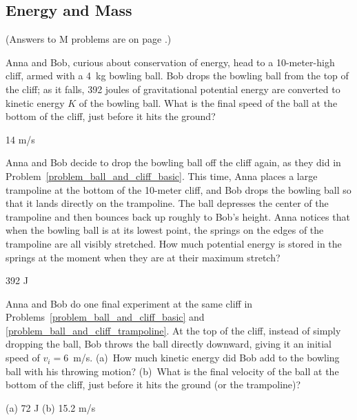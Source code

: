 \subsection{Energy and Mass} 

(Answers to M problems are on page \pageref{energy_mass_prob_answers}.)


\begin{Exercise}[difficulty=1]
\label{problem_ball_and_cliff_basic}
Anna and Bob, curious about conservation of energy, head to a 10-meter-high cliff, armed with a 4~kg bowling ball.  Bob drops the bowling ball from the top of the cliff; as it falls, 392 joules of gravitational potential energy are converted to kinetic energy $K$ of the bowling ball.  What is the final speed of the ball at the bottom of the cliff, just before it hits the ground?
\end{Exercise}
\begin{Answer}
14 m/s
\end{Answer}

\begin{Exercise}[difficulty=1]
\label{problem_ball_and_cliff_trampoline}
Anna and Bob decide to drop the bowling ball off the cliff again, as they did in 
Problem~\ref{problem_ball_and_cliff_basic}.  This time, Anna places a large trampoline at the bottom of the 10-meter cliff, and Bob drops the bowling ball so that it lands directly on the trampoline.  The ball depresses the center of the trampoline and then bounces back up roughly to Bob's height.  Anna notices that when the bowling ball is at its lowest point, the springs on the edges of the trampoline are all visibly stretched.  How much potential energy is stored in the springs at the moment when they are at their maximum stretch?
\end{Exercise}
\begin{Answer}
392 J
\end{Answer}


\begin{Exercise}[difficulty=0]
Anna and Bob do one final experiment at the same cliff in Problems~\ref{problem_ball_and_cliff_basic} and \ref{problem_ball_and_cliff_trampoline}.  At the top of the cliff, instead of simply dropping the ball, Bob throws the ball directly downward, giving it an initial speed of $v_i=6$~m/s.  (a)~How much kinetic energy did Bob add to the bowling ball with his throwing motion?  (b)~What is the final velocity of the ball at the bottom of the cliff, just before it hits the ground (or the trampoline)?
\end{Exercise}
\begin{Answer}
(a) 72 J (b) 15.2 m/s
\end{Answer}



